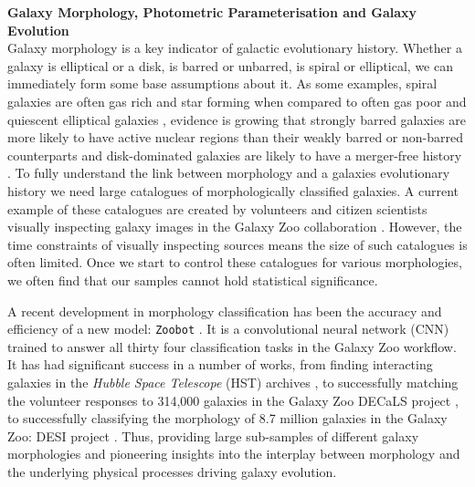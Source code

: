\documentclass[11pt]{article}
\begin{document}
\vspace{-5mm}
\justification
\vspace{-3mm}
\noindent\textbf{Galaxy Morphology, Photometric Parameterisation and Galaxy Evolution} \\
Galaxy morphology is a key indicator of galactic evolutionary history. Whether a galaxy is elliptical or a disk, is barred or unbarred, is spiral or elliptical, we can immediately form some base assumptions about it. As some examples, spiral galaxies are often gas rich and star forming when compared to often gas poor and quiescent elliptical galaxies \citep{2022MNRAS.510.4126S}, evidence is growing that strongly barred galaxies are more likely to have active nuclear regions than their weakly barred or non-barred counterparts \citep{izzy..paper} and disk-dominated galaxies are likely to have a merger-free history \citep{2017MNRAS.470.1559S}. To fully understand the link between morphology and a galaxies evolutionary history we need large catalogues of morphologically classified galaxies. A current example of these catalogues are created by volunteers and citizen scientists visually inspecting galaxy images in the Galaxy Zoo collaboration \cite{2008MNRAS.389.1179L}. However, the time constraints of visually inspecting sources means the size of such catalogues is often limited. Once we start to control these catalogues for various morphologies, we often find that our samples cannot hold statistical significance.

A recent development in morphology classification has been the accuracy and efficiency of a new model: \texttt{Zoobot} \cite{2023JOSS....8.5312W}. It is a convolutional neural network (CNN) trained to answer all thirty four classification tasks in the Galaxy Zoo workflow. It has had significant success in a number of works, from finding interacting galaxies in the \textit{Hubble Space Telescope} (HST) archives \cite{2023ApJ...948...40O}, to successfully matching the volunteer responses to 314,000 galaxies in the Galaxy Zoo DECaLS project \cite{2022MNRAS.509.3966W}, to successfully classifying the morphology of 8.7 million galaxies in the Galaxy Zoo: DESI project \cite{mikes..paper}. Thus, providing large sub-samples of different galaxy morphologies and pioneering insights into the interplay between morphology and the underlying physical processes driving galaxy evolution. 
\end{document}
